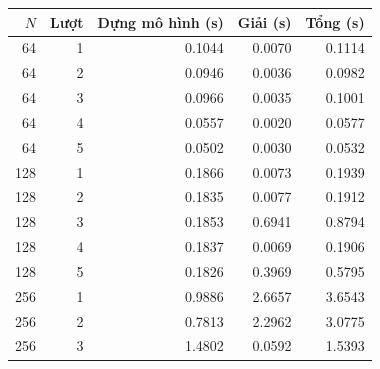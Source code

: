 \begin{tabular}{rrrrr}
\toprule
$N$ & Lượt & Dựng mô hình (s) & Giải (s) & Tổng (s) \\
\midrule
64 & 1 & 0.1044 & 0.0070 & 0.1114 \\
64 & 2 & 0.0946 & 0.0036 & 0.0982 \\
64 & 3 & 0.0966 & 0.0035 & 0.1001 \\
64 & 4 & 0.0557 & 0.0020 & 0.0577 \\
64 & 5 & 0.0502 & 0.0030 & 0.0532 \\
128 & 1 & 0.1866 & 0.0073 & 0.1939 \\
128 & 2 & 0.1835 & 0.0077 & 0.1912 \\
128 & 3 & 0.1853 & 0.6941 & 0.8794 \\
128 & 4 & 0.1837 & 0.0069 & 0.1906 \\
128 & 5 & 0.1826 & 0.3969 & 0.5795 \\
256 & 1 & 0.9886 & 2.6657 & 3.6543 \\
256 & 2 & 0.7813 & 2.2962 & 3.0775 \\
256 & 3 & 1.4802 & 0.0592 & 1.5393 \\
\bottomrule
\end{tabular}
